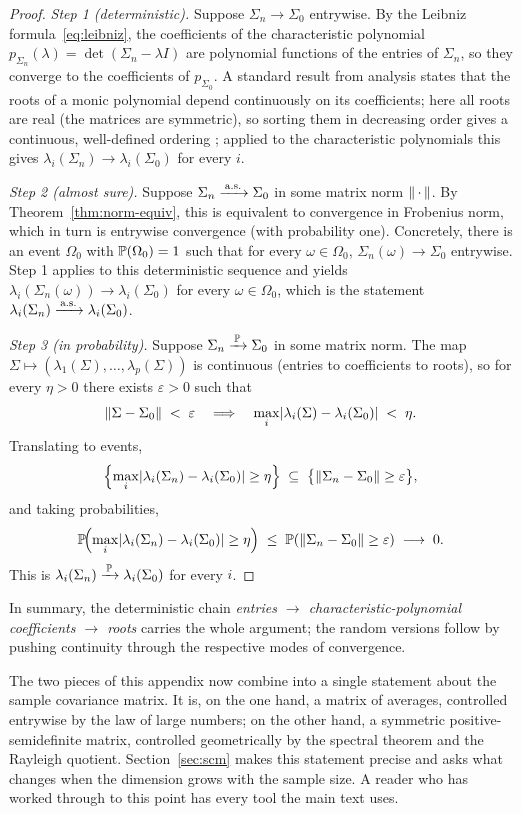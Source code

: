 \begin{proof}
\emph{Step 1 (deterministic).} Suppose \(\Sigma_n \to \Sigma_0\) entrywise. By the Leibniz formula~\eqref{eq:leibniz}, the coefficients of the characteristic polynomial \(p_{\Sigma_n}(\lambda) = \det(\Sigma_n - \lambda I)\) are polynomial functions of the entries of \(\Sigma_n\), so they converge to the coefficients of \(p_{\Sigma_0}\). A standard result from analysis states that the roots of a monic polynomial depend continuously on its coefficients; here all roots are real (the matrices are symmetric), so sorting them in decreasing order gives a continuous, well-defined ordering \citep[see, e.g.,][]{HornJohnson2013}; applied to the characteristic polynomials this gives \(\lambda_i(\Sigma_n) \to \lambda_i(\Sigma_0)\) for every \(i\).

\emph{Step 2 (almost sure).} Suppose \(\Sigma_n \xrightarrow{\,\text{a.s.}\,} \Sigma_0\) in some matrix norm \(\lVert\,\cdot\,\rVert\). By Theorem~\ref{thm:norm-equiv}, this is equivalent to convergence in Frobenius norm, which in turn is entrywise convergence (with probability one). Concretely, there is an event \(\Omega_0\) with \(\mathbb{P}(\Omega_0) = 1\) such that for every \(\omega \in \Omega_0\), \(\Sigma_n(\omega) \to \Sigma_0\) entrywise. Step 1 applies to this deterministic sequence and yields \(\lambda_i(\Sigma_n(\omega)) \to \lambda_i(\Sigma_0)\) for every \(\omega \in \Omega_0\), which is the statement \(\lambda_i(\Sigma_n) \xrightarrow{\,\text{a.s.}\,} \lambda_i(\Sigma_0)\).

\emph{Step 3 (in probability).} Suppose \(\Sigma_n \xrightarrow{\,\mathbb{P}\,} \Sigma_0\) in some matrix norm. The map \(\Sigma \mapsto (\lambda_1(\Sigma), \ldots, \lambda_p(\Sigma))\) is continuous (entries to coefficients to roots), so for every \(\eta > 0\) there exists \(\varepsilon > 0\) such that
\[
  \lVert\Sigma - \Sigma_0\rVert \;<\; \varepsilon \quad \Longrightarrow \quad \max_i \lvert\lambda_i(\Sigma) - \lambda_i(\Sigma_0)\rvert \;<\; \eta.
\]
Translating to events,
\[
  \Bigl\{\max_i \lvert\lambda_i(\Sigma_n) - \lambda_i(\Sigma_0)\rvert \ge \eta\Bigr\} \;\subseteq\; \bigl\{\lVert\Sigma_n - \Sigma_0\rVert \ge \varepsilon\bigr\},
\]
and taking probabilities,
\[
  \mathbb{P}\!\Bigl(\max_i \lvert\lambda_i(\Sigma_n) - \lambda_i(\Sigma_0)\rvert \ge \eta\Bigr) \;\le\; \mathbb{P}(\lVert\Sigma_n - \Sigma_0\rVert \ge \varepsilon) \;\longrightarrow\; 0.
\]
This is \(\lambda_i(\Sigma_n) \xrightarrow{\,\mathbb{P}\,} \lambda_i(\Sigma_0)\) for every \(i\).
\end{proof}

In summary, the deterministic chain \emph{entries \(\to\) characteristic-polynomial coefficients \(\to\) roots} carries the whole argument; the random versions follow by pushing continuity through the respective modes of convergence.

The two pieces of this appendix now combine into a single statement about the sample covariance matrix. It is, on the one hand, a matrix of averages, controlled entrywise by the law of large numbers; on the other hand, a symmetric positive-semidefinite matrix, controlled geometrically by the spectral theorem and the Rayleigh quotient. Section~\ref{sec:scm} makes this statement precise and asks what changes when the dimension grows with the sample size. A reader who has worked through to this point has every tool the main text uses.

\clearpage
